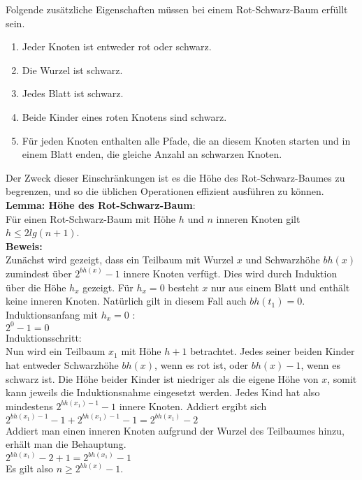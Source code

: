 \documentclass[a4paper,12pt]{article}
\begin{document}
\noindent Folgende zusätzliche Eigenschaften müssen bei einem Rot-Schwarz-Baum erfüllt sein. 

\begin{enumerate}
	\item Jeder Knoten ist entweder rot oder schwarz.
	\item Die Wurzel ist schwarz.
	\item Jedes Blatt ist schwarz.
	\item Beide Kinder eines roten Knotens sind schwarz.
	\item Für jeden Knoten enthalten alle Pfade, die an diesem Knoten starten und in einem Blatt enden, die gleiche Anzahl an schwarzen Knoten. 
\end{enumerate}  

\noindent  Der Zweck dieser Einschränkungen ist es die Höhe des Rot-Schwarz-Baumes zu begrenzen, und so die üblichen Operationen effizient ausführen zu können.
\\



\noindent\textbf{Lemma: Höhe des Rot-Schwarz-Baum}:\\
Für einen Rot-Schwarz-Baum mit Höhe $h$ und $n$ inneren Knoten gilt $h \leq  2 lg(n + 1)$. \\
\noindent\textbf{Beweis:}\\
 Zunächst wird gezeigt, dass ein Teilbaum mit Wurzel $x$ und Schwarzhöhe $\mathit{bh(x)}$ zumindest über $2^{bh(x)} - 1$ innere Knoten verfügt. Dies wird durch Induktion über die Höhe $\mathit{h_{x}}$ gezeigt. Für $\mathit{h_{x}} = 0$ besteht $x$  nur aus einem Blatt und enthält keine inneren Knoten. Natürlich gilt in diesem Fall auch $\mathit{bh(t_1) = 0}$.  \\
Induktionsanfang mit $\mathit{h_{x} = 0}$ :\\
$2^{0} - 1 = 0$\\
Induktionsschritt:\\
Nun wird ein Teilbaum $x_1$ mit Höhe $h + 1$ betrachtet. Jedes seiner beiden Kinder hat entweder Schwarzhöhe  $\mathit{bh(x)}$, wenn es rot ist, oder $\mathit{bh(x) - 1}$, wenn es schwarz ist. Die Höhe beider Kinder ist niedriger als die eigene Höhe von $x$, somit kann jeweils die Induktionsnahme eingesetzt werden. Jedes Kind hat also mindestens $2^{bh(x_1)-1} - 1$ innere Knoten. Addiert ergibt sich   \\
$2^{bh(x_1)-1} - 1 + 2^{bh(x_1)-1} - 1  = 2^{bh(x_1)} - 2 $ \\
Addiert man einen inneren Knoten aufgrund der Wurzel des Teilbaumes hinzu, erhält man die Behauptung.\\
$2^{bh(x_1)} - 2 + 1 = 2^{bh(x_1)} - 1 $\\
Es gilt also $n \geq 2^{\mathit{bh(x)}} - 1$.
\end{document}
